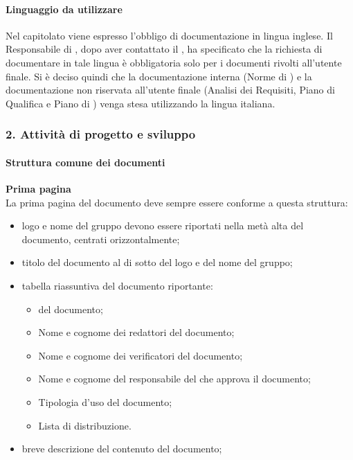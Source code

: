   \paragraph*{Linguaggio da utilizzare}
  Nel capitolato viene espresso l'obbligo di documentazione in lingua inglese. Il Responsabile di , dopo aver contattato il , ha specificato che la richiesta di documentare in tale lingua è obbligatoria solo per i documenti rivolti all'utente finale. Si è deciso quindi che la documentazione interna (Norme di ) e la documentazione non riservata all'utente finale (Analisi dei Requisiti, Piano di Qualifica e Piano di ) venga stesa utilizzando la lingua italiana.  





\subsubsection{2. Attivit\`a di progetto e sviluppo}   %
  \paragraph*{Struttura comune dei documenti}
      \textbf{Prima pagina} \\   
      La prima pagina del documento deve sempre essere conforme a questa struttura:
      \begin{itemize}
      \item logo e nome del gruppo devono essere riportati nella metà alta del documento, centrati orizzontalmente;
      \item titolo del documento al di sotto del logo e del nome del gruppo;
      \item tabella riassuntiva del documento riportante:
        \begin{itemize}
        \item {} del documento;
        \item Nome e cognome dei redattori del documento;
        \item Nome e cognome dei verificatori del documento;
        \item Nome e cognome del responsabile del  che approva il documento;
        \item Tipologia d'uso del documento;
        \item Lista di distribuzione.
        \end{itemize}
    \item breve descrizione del contenuto del documento;
      \end{itemize}

